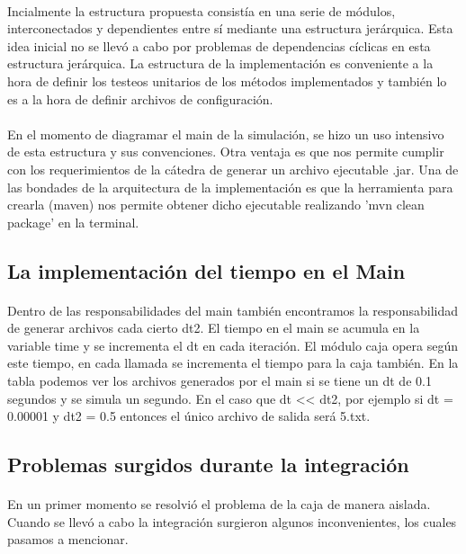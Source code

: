 \documentclass{article}
\begin{document}
\paragraph{}
Incialmente la estructura propuesta consistía en una serie de módulos, interconectados y dependientes entre sí mediante una estructura jerárquica. Esta idea inicial no se llevó a cabo por problemas de dependencias cíclicas en esta estructura jerárquica. La estructura de la implementación es conveniente a la hora de definir los testeos unitarios de los métodos implementados y también lo es a la hora de definir archivos de configuración. 

\paragraph{}
En el momento de diagramar el main de la simulación, se hizo un uso intensivo de esta estructura y sus convenciones. Otra ventaja es que nos permite cumplir con los requerimientos de la cátedra de generar un archivo ejecutable .jar. Una de las bondades de la arquitectura de la implementación es que la herramienta para crearla (maven) nos permite obtener dicho ejecutable realizando 'mvn clean package' en la terminal.

\subsection{La implementación del tiempo en el Main}

\paragraph{}
Dentro de las responsabilidades del main también encontramos la responsabilidad de generar archivos cada cierto dt2. El tiempo en el main se acumula en la variable time y se incrementa el dt en cada iteración. El módulo caja opera según este tiempo, en cada llamada se incrementa el tiempo para la caja también.
En la tabla podemos ver los archivos generados por el main si se tiene un dt de 0.1 segundos y se simula un segundo. En el caso que dt << dt2, por ejemplo si dt = 0.00001 y dt2 = 0.5 entonces el único archivo de salida será 5.txt.

\subsection{Problemas surgidos durante la integración}

\paragraph{}
En un primer momento se resolvió el problema de la caja de manera aislada. Cuando se llevó a cabo la integración surgieron algunos inconvenientes, los cuales pasamos a mencionar.
\end{document}
